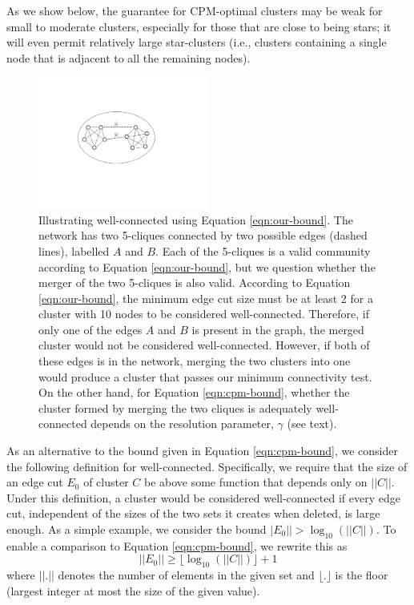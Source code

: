 \documentclass[11pt]{article}   	%
\begin{document}
As we show below, the guarantee for CPM-optimal clusters may be weak for small to moderate clusters, especially for those that are close to being stars; it will even permit relatively 
large star-clusters (i.e., clusters containing a single node that is adjacent to all the remaining nodes).

\begin{figure}[h!]
\centering
\includegraphics[width=0.5\textwidth]{figs/fig_clique.pdf}
\caption{Illustrating well-connected using Equation \ref{eqn:our-bound}. The network has two 5-cliques connected by two possible edges (dashed lines), labelled $A$ and $B$.
Each of the 5-cliques is a valid community according to Equation \ref{eqn:our-bound}, but we question whether the merger of the two 5-cliques is also valid. 
According to Equation \ref{eqn:our-bound}, the minimum edge cut size  must be at least 2 for a cluster with 10 nodes to be considered well-connected.  
Therefore, if only one of the edges $A$ and $B$ is present in the graph, the merged cluster  would not  be considered well-connected.
However, if both of these edges is in the network, merging the two clusters into one would produce a cluster that passes our minimum connectivity test.
On the other hand, for Equation \ref{eqn:cpm-bound}, whether the cluster formed by merging the two cliques is adequately well-connected depends on the resolution parameter, $\gamma$ (see text).}
\label{fig:2cliques}
\end{figure}

As an alternative to the bound given in Equation \ref{eqn:cpm-bound},  we consider the
following definition for well-connected.
Specifically, we require that the size of an edge cut  $E_0$  of cluster $C$ be above some function that depends only on $||C||$.
Under this definition, a cluster would be considered well-connected if every edge cut, independent of the sizes of the
two sets it creates when deleted, is large enough.
As a simple example, we consider the bound $|E_0|| > \log_{10}(||C||)$.  To enable a comparison to Equation \ref{eqn:cpm-bound}, we rewrite this  as 
\begin{equation}
  ||E_0|| \geq  \lfloor \log_{10}(||C||) \rfloor +1
  \label{eqn:our-bound}
  \end{equation}
where $||.||$ denotes the number of elements in the given set and
$\lfloor . \rfloor$ is the floor (largest integer at most the size of the given value).
\end{document}
